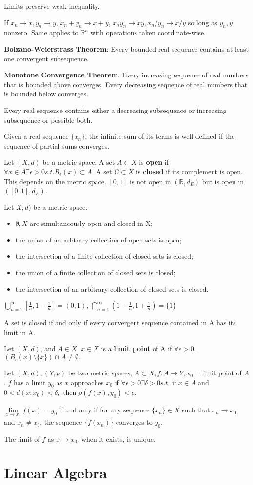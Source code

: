 \documentclass[11pt]{article} %
\begin{document}
Limits preserve weak inequality.

If $x_n \rightarrow x, y_n \rightarrow y$, $x_n + y_n \rightarrow x + y$, $x_ny_n \rightarrow xy, x_n/y_n \rightarrow x/y$ so long as $y_n,y$ nonzero. Same applies to $\mathbb{R}^n$ with operations taken coordinate-wise.

\textbf{Bolzano-Weierstrass Theorem}: Every bounded real sequence contains at least one convergent subsequence.

\textbf{Monotone Convergence Theorem}: Every increasing sequence of real numbers that is bounded above converges. Every decreasing sequence of real numbers that is bounded below converges.

Every real sequence contains either a decreasing subsequence or increasing subsequence or possible both.

Given a real sequence $\{ x_n\}$, the infinite sum of its terms is well-defined if the sequence of partial sums converges.

Let $(X,d)$ be a metric space. A set $A\subset X$ is \textbf{open} if $\forall x \in A \exists \epsilon > 0 s.t. B_\epsilon(x) \subset A.$ A set $C \subset X$ is \textbf{closed} if its complement is open. This depends on the metric space. $[0,1]$ is not open in $(\mathbb{R},d_E)$ but is open in $([0,1],d_E)$.

Let $X,d)$ be a metric space.
\begin{itemize}
\item $\emptyset,X$ are simultaneously open and closed in X;
\item the union of an arbtrary collection of open sets is open;
\item the intersection of a finite collection of closed sets is closed;
\item the union of a finite collection of closed sets is closed;
\item the intersection of an arbitrary collection of closed sets is closed.
\end{itemize}
$\bigcup_{n=1}^{\infty}\left[ \frac{1}{n}, 1 - \frac{1}{n}\right] = (0,1)$, $\bigcap_{n=1}^{\infty}\left(1- \frac{1}{n}, 1 + \frac{1}{n}\right) = \{1\}$

A set is closed if and only if every convergent sequence contained in A has its limit in A.

Let $(X,d)$, and $A \in X$. $x \in X$ is a \textbf{limit point} of A if $\forall \epsilon > 0,$ $(B_{\epsilon}(x) \setminus \{ x\})\cap A \neq \emptyset.$

Let $(X,d),(Y,\rho)$ be two metric spaces, $A \subset X, f:A \rightarrow Y, x_0 =$limit point of $A$. $f$ has a limit $y_0$ as $x$ approaches $x_0$ if $\forall \epsilon>0 \exists \delta > 0 s.t.$ if $x \in A$ and $0<d(x,x_0) < \delta,$ then $\rho(f(x),y_0) < \epsilon.$

$\lim\limits_{x \rightarrow x_0} f(x) = y_0$ if and only if for any sequence $\{ x_n\} \in X$ such that $x_n \rightarrow x_0$ and $x_n\neq x_0$, the sequence $\{ f(x_n)\}$ converges to $y_0$.

The limit of $f$ as $x \rightarrow x_0$, when it exists, is unique.

\section{Linear Algebra}
\end{document}
